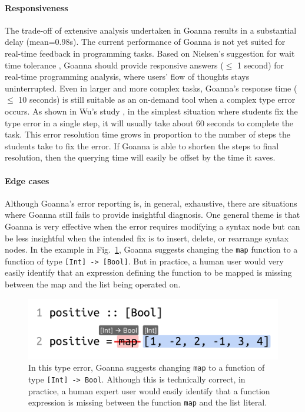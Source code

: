     \paragraph{\textbf{Responsiveness}}
    The trade-off of extensive analysis undertaken in Goanna results in a substantial delay (mean=0.98s).
    The current performance of Goanna is not yet suited for real-time feedback in programming tasks. Based on Nielsen's suggestion for wait time tolerance \cite{Ferdowsi2023-au}, Goanna should provide responsive answers ($\leq$ 1 second) for real-time programming analysis, where users' flow of thoughts stays uninterrupted. Even in larger and more complex tasks, Goanna's response time ($\leq$ 10 seconds) is still suitable as an on-demand tool when a complex type error occurs. As shown in Wu's study \cite{Wu2017-eb}, in the simplest situation where students fix the type error in a single step, it will usually take about 60 seconds to complete the task. This error resolution time grows in proportion to the number of steps the students take to fix the error. If Goanna is able to shorten the steps to final resolution, then the querying time will easily be offset by the time it saves.

    \paragraph{\textbf{Edge cases}} \label{sec:edge-case}
    Although Goanna's error reporting is, in general, exhaustive, there are situations where Goanna still fails to provide insightful diagnosis. One general theme is that Goanna is very effective when the error requires modifying a syntax node but can be less insightful when the intended fix is to insert, delete, or rearrange syntax nodes. In the example in Fig.~\ref{fig:weakness}, Goanna suggests changing the \texttt{map} function to a function of type \texttt{[Int] -> [Bool]}. But in practice, a human user would very easily identify that an expression defining the function to be mapped is missing between the map and the list being operated on.
    
        \begin{figure}[htb!]
        \centering
        \includegraphics[width=0.6\linewidth]{images/Weakness}
        \caption{\textbf{} In this type error, Goanna suggests changing \texttt{map} to a function of type \texttt{[Int] -> Bool}. Although this is technically correct, in practice, a human expert user would easily identify that a function expression is missing between the function \texttt{map} and the list literal.}
        \label{fig:weakness}
    \end{figure}

